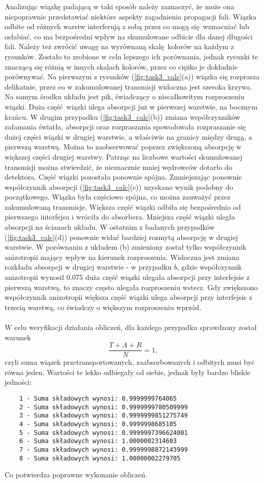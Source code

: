 \documentclass[a4paper, 12pt]{article}
\begin{document}
	\noindent Analizując wiązkę padającą w taki sposób należy zaznaczyć, że może ona niepoprawnie przedstawiać niektóre aspekty zagadnienia propagacji fali.
	Wiązka odbite od różnych warstw interferują z sobą przez co mogą się wzmacniać lub osłabiać, co ma bezpośredni wpływ na skumulowane odbicie dla danej długości fali.
	Należy też zwrócić uwagę na wyrównaną skalę kolorów na każdym z rysunków. 
	Zostało to zrobione w celu lepszego ich porównania, jednak rysunki te znaczącą się różnią w innych skalach kolorów, przez co ciężko je dokładnie porównywać.
	Na pierwszym z rysunków (\ref{fig:task3_calc}(a)) wiązka się rozprasza delikatnie, przez co w zakumulowanej transmisji widoczna jest szeroka krzywa. 
	Na samym środku układu jest pik, świadczący o niecałkowitym rozproszeniu wiązki.
	Duża część wiązki ulega absorpcji już w pierwszej warstwie, na bocznym krańcu. 
	W drugim przypadku (\ref{fig:task3_calc}(b)) zmiana współczynników załamania światła, absorpcji oraz rozpraszania spowodowała rozpraszanie się dużej części wiązki w drugiej warstwie, a właściwie na granicy między drugą, a pierwszą warstwą. 
	Można to zaobserwować poprzez zwiększoną absorpcję w większej części drugiej warstwy. 
	Patrząc na liczbowe wartości skumulowanej transmisji można stwierdzić, że nieznacznie mniej wędrowców dotarło do detektora.
	Część wiązki pozostała ponownie spójna.
	Zmniejszając ponownie współczynnik absorpcji (\ref{fig:task3_calc}(c)) uzyskano wynik podobny do początkowego.
	Wiązka była częściowo spójna, co można zauważyć przez zakumulowaną transmisje. 
	Większa część wiązki odbiła się bezpośrednio od pierwszego interfejsu i wróciła do absorbera. 
	Mniejsza część wiązki uległa absorpcji na ścianach układu.
	W ostatnim z badanych przypadków (\ref{fig:task3_calc}(d)) ponownie widać bardziej rozmytą absorpcję w drugiej warstwie.
	W porównaniu z układem (b) zmieniony został tylko współczynnik anizotropii mający wpływ na kierunek rozproszenia.
	Widoczna jest zmiana rozkładu absorpcji w drugiej warstwie - w przypadku $b$, gdzie współczynnik anizotropii wynosił 0.075 duża część wiązki ulegała absorpcji przy interfejsie z pierwszą warstwą, to znaczy często ulegała rozproszeniu wstecz.
	Gdy zwiększono współczynnik anizotropii większa część wiązki ulega absorpcji przy interfejsie z trzecią warstwą, co świadczy o większym rozproszeniu wprzód.  
	\\
	\\
	W celu weryfikacji działania obliczeń, dla każdego przypadku sprawdzony został warunek 
	\[\frac{T + A + R}{N} = 1,\]
	czyli suma wiązek przetransportowanych, zaabsorbowanych i odbitych musi być równa jeden. 
	Wartości te lekko odbiegały od siebie, jednak były bardzo bliskie jedności:
	\begin{verbatim}
	1 - Suma składowych wynosi: 0.9999999764065
	2 - Suma składowych wynosi: 0.9999999780509999
	3 - Suma składowych wynosi: 0.9999999851275749
	4 - Suma składowych wynosi: 0.9999998685105
	5 - Suma składowych wynosi: 0.9999997396624001
	6 - Suma składowych wynosi: 1.0000002314603
	7 - Suma składowych wynosi: 0.9999998872143999
	8 - Suma składowych wynosi: 1.00000002279705
	\end{verbatim}
	Co potwierdza poprawne wykonanie obliczeń.
	
\end{document}
